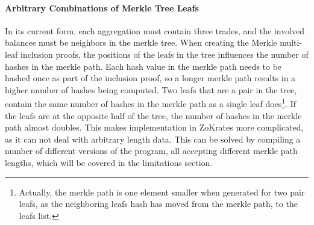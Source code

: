 \documentclass[../../thesis.tex]{subfiles}
\begin{document}
\paragraph{Arbitrary Combinations of Merkle Tree Leafs}
In its current form, each aggregation must contain three trades, and the involved balances must be neighbors in the merkle tree. When creating the Merkle multi-leaf inclusion proofs, the positions of the leafs in the tree influences the number of hashes in the merkle path. Each hash value in the merkle path needs to be hashed once as part of the inclusion proof, so a longer merkle path results in a higher number of hashes being computed. Two leafs that are a pair in the tree, contain the same number of hashes in the merkle path as a single leaf does\footnote{Actually, the merkle path is one element smaller when generated for two pair leafs, as the neighboring leafs hash has moved from the merkle path, to the leafs list.}. If the leafs are at the opposite half of the tree, the number of hashes in the merkle path almost doubles. This makes implementation in ZoKrates more complicated, as it can not deal with arbitrary length data. This can be solved by compiling a number of different versions of the program, all accepting different merkle path lengths, which will be covered in the limitations section.





\end{document}
